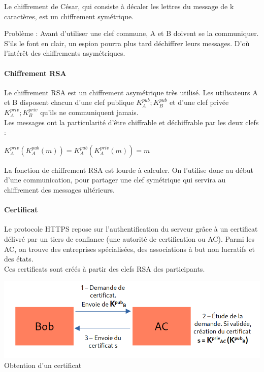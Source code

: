 \begin{example}
	Le chiffrement de César, qui consiste à décaler les lettres du message de k caractères, est un chiffrement symétrique.
\end{example}

\begin{com}
Problème : Avant d'utiliser une clef commune, A et B doivent se la communiquer. S'ils le font en clair, un espion pourra plus tard déchiffrer leurs messages. D'où l'intérêt des chiffrements asymétriques.
\end{com}

\paragraph{Chiffrement RSA\\}
	Le chiffrement RSA est un chiffrement asymétrique très utilisé. Les utilisateurs A et B disposent chacun d'une clef publique $K_{A}^{pub} ; K_{B}^{pub}$ et d'une clef privée  $K_{A}^{priv} ; K_{B}^{priv}$ qu'ils ne communiquent jamais. \\
	Les messages ont la particularité d'être chiffrable et déchiffrable par les deux clefs : \\
	\begin{center}
		$K_{A}^{priv}(K_{A}^{pub}(m)) = K_{A}^{pub}(K_{A}^{priv}(m)) = m$
	\end{center}

\begin{com}
	La fonction de chiffrement RSA est lourde à calculer. On l'utilise donc au début d'une communication, pour partager une clef symétrique qui servira au chiffrement des messages ultérieurs.
\end{com}

\paragraph{Certificat\\}
Le protocole HTTPS repose sur l'authentification du serveur grâce à un certificat délivré par un tiers de confiance (une autorité de certification ou AC). Parmi les AC, on trouve des entreprises spécialisées, des associations à but non lucratifs et des états.  \\
Ces certificats sont créés à partir des clefs RSA des participants. 
\\
\begin{center}
	\includegraphics[scale=0.5]{Developpements/Protocole HTTPS/certificat.png}
	{Obtention d'un certificat}
\end{center}

